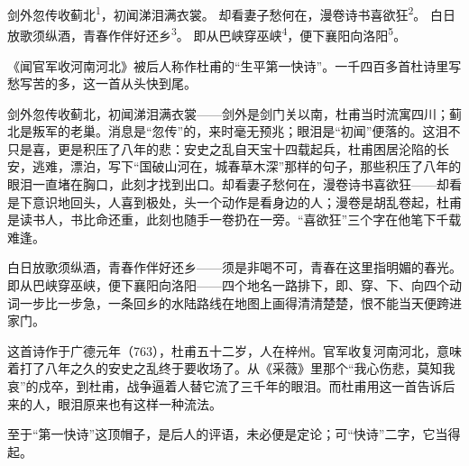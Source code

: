 
\begin{poem}
剑外忽传收蓟北\textsuperscript{1}，初闻涕泪满衣裳。
却看妻子愁何在，漫卷诗书喜欲狂\textsuperscript{2}。
白日放歌须纵酒，青春作伴好还乡\textsuperscript{3}。
即从巴峡穿巫峡\textsuperscript{4}，便下襄阳向洛阳\textsuperscript{5}。
\end{poem}

\begin{annotations}
\end{annotations}

\begin{appreciation}
《闻官军收河南河北》被后人称作杜甫的“生平第一快诗”。一千四百多首杜诗里写愁写苦的多，这一首从头快到尾。

剑外忽传收蓟北，初闻涕泪满衣裳——剑外是剑门关以南，杜甫当时流寓四川；蓟北是叛军的老巢。消息是“忽传”的，来时毫无预兆；眼泪是“初闻”便落的。这泪不只是喜，更是积压了八年的悲：安史之乱自天宝十四载起兵，杜甫困居沦陷的长安，逃难，漂泊，写下“国破山河在，城春草木深”那样的句子，那些积压了八年的眼泪一直堵在胸口，此刻才找到出口。却看妻子愁何在，漫卷诗书喜欲狂——却看是下意识地回头，人喜到极处，头一个动作是看身边的人；漫卷是胡乱卷起，杜甫是读书人，书比命还重，此刻也随手一卷扔在一旁。“喜欲狂”三个字在他笔下千载难逢。

白日放歌须纵酒，青春作伴好还乡——须是非喝不可，青春在这里指明媚的春光。即从巴峡穿巫峡，便下襄阳向洛阳——四个地名一路排下，即、穿、下、向四个动词一步比一步急，一条回乡的水陆路线在地图上画得清清楚楚，恨不能当天便跨进家门。

这首诗作于广德元年（763），杜甫五十二岁，人在梓州。官军收复河南河北，意味着打了八年之久的安史之乱终于要收场了。从《采薇》里那个“我心伤悲，莫知我哀”的戍卒，到杜甫，战争逼着人替它流了三千年的眼泪。而杜甫用这一首告诉后来的人，眼泪原来也有这样一种流法。

至于“第一快诗”这顶帽子，是后人的评语，未必便是定论；可“快诗”二字，它当得起。
\end{appreciation}
